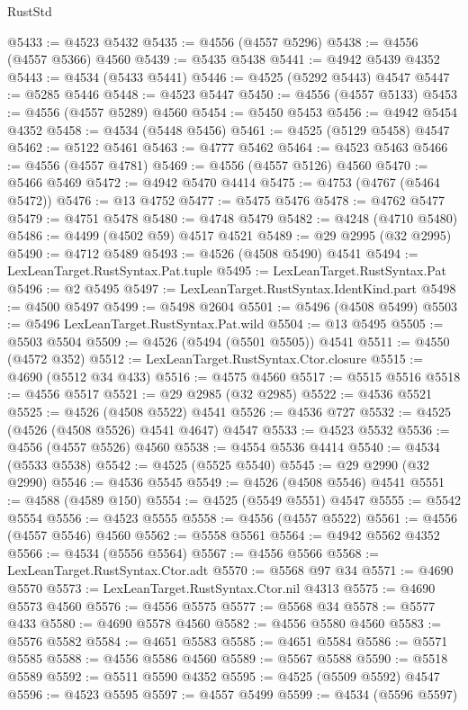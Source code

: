 \begin{lexlean}{RustStd}
\begin{coremodule}
{\begin{coremodule}
{{{{{{{{{{{{{{{{{{{{{{{{{{{{{{{{{{{{{{{{{{{{{{{{{{{{{{{@5433 := @4523 @5432
@5435 := @4556 (@4557 @5296)
@5438 := @4556 (@4557 @5366) @4560
@5439 := @5435 @5438
@5441 := @4942 @5439 @4352
@5443 := @4534 (@5433 @5441)
@5446 := @4525 (@5292 @5443) @4547
@5447 := @5285 @5446
@5448 := @4523 @5447
@5450 := @4556 (@4557 @5133)
@5453 := @4556 (@4557 @5289) @4560
@5454 := @5450 @5453
@5456 := @4942 @5454 @4352
@5458 := @4534 (@5448 @5456)
@5461 := @4525 (@5129 @5458) @4547
@5462 := @5122 @5461
@5463 := @4777 @5462
@5464 := @4523 @5463
@5466 := @4556 (@4557 @4781)
@5469 := @4556 (@4557 @5126) @4560
@5470 := @5466 @5469
@5472 := @4942 @5470 @4414
@5475 := @4753 (@4767 (@5464 @5472))
@5476 := @13 @4752
@5477 := @5475 @5476
@5478 := @4762 @5477
@5479 := @4751 @5478
@5480 := @4748 @5479
@5482 := @4248 (@4710 @5480)
@5486 := @4499 (@4502 @59) @4517 @4521
@5489 := @29 @2995 (@32 @2995)
@5490 := @4712 @5489
@5493 := @4526 (@4508 @5490) @4541
@5494 := LexLeanTarget.RustSyntax.Pat.tuple
@5495 := LexLeanTarget.RustSyntax.Pat
@5496 := @2 @5495
@5497 := LexLeanTarget.RustSyntax.IdentKind.part
@5498 := @4500 @5497
@5499 := @5498 @2604
@5501 := @5496 (@4508 @5499)
@5503 := @5496 LexLeanTarget.RustSyntax.Pat.wild
@5504 := @13 @5495
@5505 := @5503 @5504
@5509 := @4526 (@5494 (@5501 @5505)) @4541
@5511 := @4550 (@4572 @352)
@5512 := LexLeanTarget.RustSyntax.Ctor.closure
@5515 := @4690 (@5512 @34 @433)
@5516 := @4575 @4560
@5517 := @5515 @5516
@5518 := @4556 @5517
@5521 := @29 @2985 (@32 @2985)
@5522 := @4536 @5521
@5525 := @4526 (@4508 @5522) @4541
@5526 := @4536 @727
@5532 := @4525 (@4526 (@4508 @5526) @4541 @4647) @4547
@5533 := @4523 @5532
@5536 := @4556 (@4557 @5526) @4560
@5538 := @4554 @5536 @4414
@5540 := @4534 (@5533 @5538)
@5542 := @4525 (@5525 @5540)
@5545 := @29 @2990 (@32 @2990)
@5546 := @4536 @5545
@5549 := @4526 (@4508 @5546) @4541
@5551 := @4588 (@4589 @150)
@5554 := @4525 (@5549 @5551) @4547
@5555 := @5542 @5554
@5556 := @4523 @5555
@5558 := @4556 (@4557 @5522)
@5561 := @4556 (@4557 @5546) @4560
@5562 := @5558 @5561
@5564 := @4942 @5562 @4352
@5566 := @4534 (@5556 @5564)
@5567 := @4556 @5566
@5568 := LexLeanTarget.RustSyntax.Ctor.adt
@5570 := @5568 @97 @34
@5571 := @4690 @5570
@5573 := LexLeanTarget.RustSyntax.Ctor.nil @4313
@5575 := @4690 @5573 @4560
@5576 := @4556 @5575
@5577 := @5568 @34
@5578 := @5577 @433
@5580 := @4690 @5578 @4560
@5582 := @4556 @5580 @4560
@5583 := @5576 @5582
@5584 := @4651 @5583
@5585 := @4651 @5584
@5586 := @5571 @5585
@5588 := @4556 @5586 @4560
@5589 := @5567 @5588
@5590 := @5518 @5589
@5592 := @5511 @5590 @4352
@5595 := @4525 (@5509 @5592) @4547
@5596 := @4523 @5595
@5597 := @4557 @5499
@5599 := @4534 (@5596 @5597)
}}}}}}}}}}}}}}}}}}}}}}}}}}}}}}}}}}}}}}}}}}}}}}}}}}}}}}}
\end{coremodule}}
\end{coremodule}
\end{lexlean}
